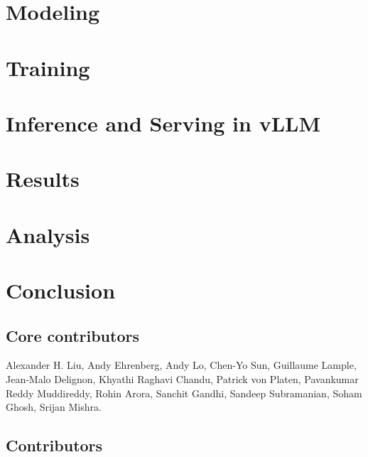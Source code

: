 \documentclass{article}
\begin{document}
% 

\section{Modeling}


\section{Training} \label{sec:training}


\section{Inference and Serving in vLLM}


\section{Results}


\section{Analysis}


\section{Conclusion}


\subsection*{Core contributors}

Alexander H. Liu, Andy Ehrenberg, Andy Lo, Chen-Yo Sun, Guillaume Lample, Jean-Malo Delignon, Khyathi Raghavi Chandu, Patrick von Platen, Pavankumar Reddy Muddireddy, Rohin Arora, Sanchit Gandhi, Sandeep Subramanian, Soham Ghosh, Srijan Mishra.

\subsection*{Contributors}
\end{document}
